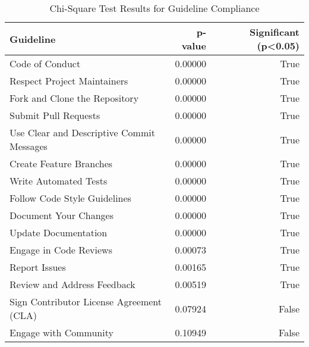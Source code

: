 \begin{table}
\caption{Chi-Square Test Results for Guideline Compliance}
\label{tab:chi_square}
\begin{tabular}{lrr}
\toprule
Guideline & p-value & Significant (p<0.05) \\
\midrule
Code of Conduct & 0.00000 & True \\
Respect Project Maintainers & 0.00000 & True \\
Fork and Clone the Repository & 0.00000 & True \\
Submit Pull Requests & 0.00000 & True \\
Use Clear and Descriptive Commit Messages & 0.00000 & True \\
Create Feature Branches & 0.00000 & True \\
Write Automated Tests & 0.00000 & True \\
Follow Code Style Guidelines & 0.00000 & True \\
Document Your Changes & 0.00000 & True \\
Update Documentation & 0.00000 & True \\
Engage in Code Reviews & 0.00073 & True \\
Report Issues & 0.00165 & True \\
Review and Address Feedback & 0.00519 & True \\
Sign Contributor License Agreement (CLA) & 0.07924 & False \\
Engage with Community & 0.10949 & False \\
\bottomrule
\end{tabular}
\end{table}

